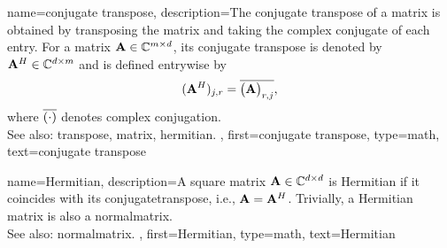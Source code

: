 {name={conjugate transpose},
	description={The conjugate \gls{transpose} of a 
		\gls{matrix} is obtained by transposing the \gls{matrix} 
		and taking the complex conjugate of each entry.
		For a \gls{matrix} ${\bf A} \in \mathbb{C}^{m \times d}$, its
		conjugate \gls{transpose} is denoted by ${\bf A}^{H} \in 
		\mathbb{C}^{d \times m}$ and is defined entrywise by
		\[
                 ({\bf A}^{H})_{j,r}
                 = \overline{\big({\bf A}\big)_{r,j}},
		\]
		where $\overline{(\cdot)}$ denotes complex conjugation.
		\\
		See also: \gls{transpose}, \gls{matrix}, \gls{hermitian}. },
 	first={conjugate transpose},
    	type=math, 
 	text={conjugate transpose}
 }

 {name={Hermitian},
 	description={A square \gls{matrix} ${\bf A} \in \mathbb{C}^{d \times d}$ is 
		Hermitian if it coincides with its \gls{conjugatetranspose}, i.e., ${\bf A}={\bf A}^{H}$. 
                 Trivially, a Hermitian \gls{matrix} is also a \gls{normalmatrix}.
                 \\
                 See also: \gls{normalmatrix}. },
 	first={Hermitian},
     	type=math,
 	text={Hermitian}
}

